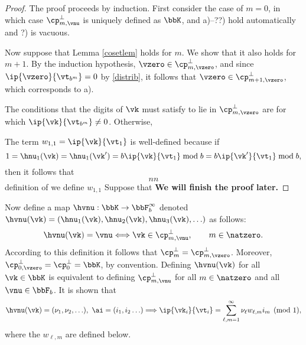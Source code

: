 \documentclass[]{elsarticle}
\theoremstyle{definition}
\begin{document}
\begin{proof} The proof proceeds by induction.  First consider the case of $m=0$, in which case $\cp_{m,\vnu}^{\perp}$ is uniquely defined as $\bbK$, and a)--??) hold automatically and ?) is vacuous. 

Now suppose that Lemma \ref{cosetlem} holds for $m$.  We show that it also holds for $m+1$.  By the induction hypothesis, $\vzero \in \cp_{m,\vzero}^{\perp}$, and since $\ip{\vzero}{\vt_{b^{m}}}=0$ by \eqref{distrib}, it follows that $\vzero \in \cp_{m+1,\vzero}^{\perp}$, which corresponds to a).

The conditions that the digits of $\vk$ must satisfy to lie in $\cp_{m,\vzero}^{\perp}$ are  for which $\ip{\vk}{\vt_{b^{m}}}\ne 0$.  Otherwise,  












The term $w_{1,1} = \ip{\vk}{\vt_{1}}$ is well-defined because if 
\[
1=\hnu_1(\vk)=\hnu_1(\vk')=b \ip{\vk}{\vt_{1}} \bmod b = b \ip{\vk'}{\vt_{1}} \bmod b,
\]
then it follows that 
\[
nn
\]
 definition of  we define $w_{1,1}$ Suppose that 
{\bf We will finish the proof later.}
\end{proof}


Now define a map $\hvnu: \bbK \to \bbF_b^\infty$ denoted $\hvnu(\vk)=(\hnu_1(\vk), \hnu_2(\vk), \hnu_3(\vk), \ldots )$ as follows:
\[
\hvnu(\vk)=\vnu \Longleftrightarrow \vk \in \cp_{m,\vnu}^{\perp}, \qquad m \in \natzero.
\]
According to this definition it follows that $\cp_{m}^{\perp}=\cp_{m,\vzero}^{\perp}$.  Moreover, $\cp_{0,\vzero}^{\perp}=\cp_{0}^{\perp}=\bbK$, by convention.  Defining $\hvnu(\vk)$ for all $\vk \in \bbK$ is equivalent to defining $\cp_{m,\vnu}^{\perp}$ for all $m \in \natzero$ and all $\vnu \in \bbF_b$.  It is shown that
\begin{equation} \label{nuwisum}
\hvnu(\vk)=(\nu_1, \nu_2, \ldots),\  \ai=(i_1, i_2 \ldots) \Longrightarrow \ip{\vk_i}{\vt_i} = \sum_{\ell,m=1}^{\infty} \nu_\ell w_{\ell,m} i_m \pmod 1,
\end{equation}
where the $w_{\ell,m}$ are defined below.  
\end{document}
